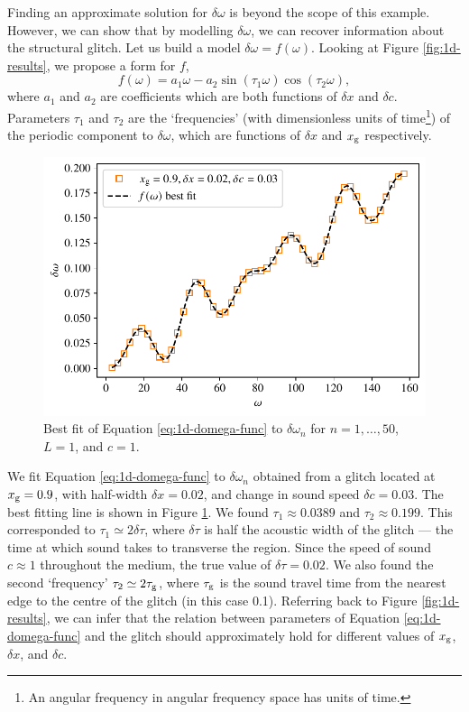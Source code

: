 Finding an approximate solution for \(\delta\omega\) is beyond the scope of this example. However, we can show that by modelling \(\delta\omega\), we can recover information about the structural glitch. Let us build a model \(\delta\omega = f(\omega)\). Looking at Figure \ref{fig:1d-results}, we propose a form for \(f\),
%
\begin{equation}
    f(\omega) = a_1 \omega - a_2 \sin (\tau_1 \omega) \cos (\tau_2 \omega), \label{eq:1d-domega-func}
\end{equation}
%
where \(a_1\) and \(a_2\) are coefficients which are both functions of \(\delta x\) and \(\delta c\). Parameters \(\tau_1\) and \(\tau_2\) are the `frequencies' (with dimensionless units of time\footnote{An angular frequency in angular frequency space has units of time.}) of the periodic component to \(\delta\omega\), which are functions of \(\delta x\) and \(x_{{\mathrm{g}}}\) respectively.

\begin{figure}[tb]
    \centering
    \includegraphics{figures/glitch-1d-fit.pdf}
    \caption{Best fit of Equation \ref{eq:1d-domega-func} to \(\delta\omega_n\) for \(n=1,\dots,50\), \(L=1\), and \(c=1\).}
    \label{fig:1d-fit}
\end{figure}

We fit Equation \ref{eq:1d-domega-func} to \(\delta\omega_n\) obtained from a glitch located at \(x_{{\mathrm{g}}} = 0.9\), with half-width \(\delta x = 0.02\), and change in sound speed \(\delta c = 0.03\). The best fitting line is shown in Figure \ref{fig:1d-fit}. We found \(\tau_1 \approx \num{0.0389}\) and \(\tau_2 \approx \num{0.199}\). This corresponded to \(\tau_1 \simeq 2\delta\tau\), where \(\delta\tau\) is half the acoustic width of the glitch --- the time at which sound takes to transverse the region. Since the speed of sound \(c \approx \num{1}\) throughout the medium, the true value of \(\delta\tau = 0.02\). We also found the second `frequency' \(\tau_2 \simeq 2\tau_{{\mathrm{g}}}\), where \(\tau_{{\mathrm{g}}}\) is the sound travel time from the nearest edge to the centre of the glitch (in this case \num{0.1}). Referring back to Figure \ref{fig:1d-results}, we can infer that the relation between parameters of Equation \ref{eq:1d-domega-func} and the glitch should approximately hold for different values of \(x_{{\mathrm{g}}}\), \(\delta x\), and \(\delta c\).

